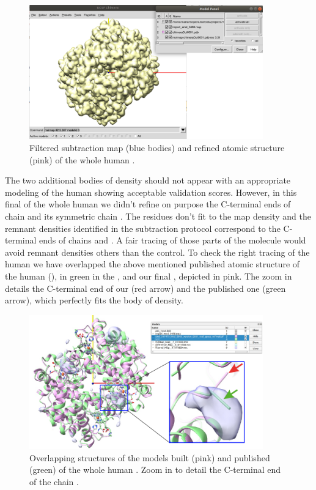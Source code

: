\begin{itemize}
  \begin{figure}[H]
    \centering 
    \captionsetup{width=.9\linewidth} 
    \includegraphics[width=0.90\textwidth]{Images/Fig43}
    \caption{Filtered subtraction map (blue bodies) and refined atomic structure (pink) of the whole human .}
    \label{fig:chimera_map_subtract_2}
   \end{figure}

The two additional bodies of density should not appear with an appropriate modeling of the human  showing acceptable validation scores. However, in this final  of the whole human  we didn't refine on purpose the C-terminal ends of chain  and its symmetric chain . The  residues don't fit to the map density and the remnant densities identified in the subtraction protocol correspond to the C-terminal ends of chains  and . A fair tracing of those parts of the molecule would avoid remnant densities others than the control. To check the right tracing of the human  we have overlapped the above mentioned published atomic structure of the human  (), in green in the , and our final , depicted in pink. The zoom in details the C-terminal end of our  (red arrow) and the published one (green arrow), which perfectly fits the body of density. 

  
  \begin{figure}[H]
    \centering 
    \captionsetup{width=.9\linewidth} 
    \includegraphics[width=0.90\textwidth]{Images/Fig44}
    \caption{Overlapping structures of the models built (pink) and published (green) of the whole human . Zoom in to detail the C-terminal end of the chain .}
    \label{fig:chimera_map_subtract_3}
   \end{figure}


\end{itemize}
